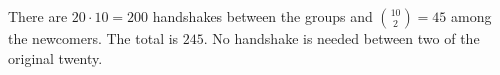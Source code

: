 There are $20\cdot10=200$ handshakes between the groups and $\binom{10}{2}=45$ among the newcomers. The total is $\boxed{245}$. No handshake is needed between two of the original twenty.
